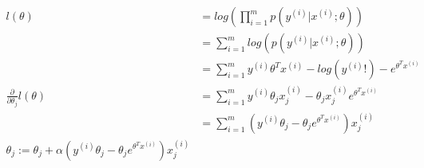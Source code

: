 \begin{answer}
    $$
    \begin{aligned}
        l(\theta) &= log(\prod_{i=1}^m p(y^{(i)}|x^{(i)};\theta))\\
                &= \sum_{i=1}^m log(p(y^{(i)}|x^{(i)};\theta))\\
                &= \sum_{i=1}^m y^{(i)}\theta^T x^{(i)} -log(y^{(i)}!) - e^{\theta^Tx^{(i)}}\\
        \frac{\partial}{\partial \theta_j}l(\theta) &= \sum_{i=1}^m y^{(i)}\theta_jx^{(i)}_j- \theta_jx_j^{(i)}e^{\theta^Tx^{(i)}}\\
                                                    &= \sum_{i=1}^m (y^{(i)}\theta_j-\theta_je^{\theta^Tx^{(i)}})x_j^{(i)}\\
        \theta_j := \theta_j + \alpha(y^{(i)}\theta_j-\theta_je^{\theta^Tx^{(i)}})x_j^{(i)}
    \end{aligned}
    $$
\end{answer}
